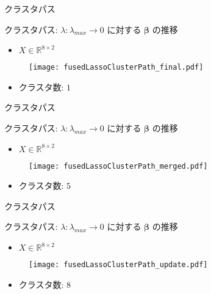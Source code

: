 \documentclass[dvipdfmx, 10pt]{beamer}
\newcommand{\zl}{\rightarrow}
\begin{document}


\begin{frame}[noframenumbering]{クラスタパス}

    クラスタパス: $\lambda: \lambda_{max} \zl 0$ に対する $\bm{\beta}$ の推移
    \begin{itemize}
        \item $X \in \mathbb{R}^{8 \times 2}$
    \end{itemize}
    \begin{figure}[htb]
        \texttt{[image: fusedLassoClusterPath\_final.pdf]}
    \end{figure}
    \begin{itemize}
        \item クラスタ数: $1$
    \end{itemize}

\end{frame}


\begin{frame}[noframenumbering]{クラスタパス}

    クラスタパス: $\lambda: \lambda_{max} \zl 0$ に対する $\bm{\beta}$ の推移
    \begin{itemize}
        \item $X \in \mathbb{R}^{8 \times 2}$
    \end{itemize}
    \begin{figure}[htb]
        \texttt{[image: fusedLassoClusterPath\_merged.pdf]}
    \end{figure}
    \begin{itemize}
        \item クラスタ数: $5$
    \end{itemize}

\end{frame}


\begin{frame}[noframenumbering]{クラスタパス}

    クラスタパス: $\lambda: \lambda_{max} \zl 0$ に対する $\bm{\beta}$ の推移
    \begin{itemize}
        \item $X \in \mathbb{R}^{8 \times 2}$
    \end{itemize}
    \begin{figure}[htb]
        \texttt{[image: fusedLassoClusterPath\_update.pdf]}
    \end{figure}
    \begin{itemize}
        \item クラスタ数: $8$
    \end{itemize}

\end{frame}

\end{document}
